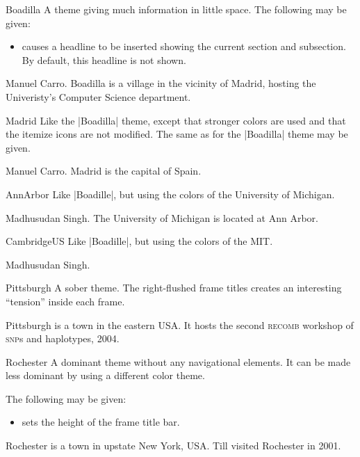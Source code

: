 \begin{themeexample}{Boadilla}
  A theme giving much information in little space. The following  may be given:
  \begin{itemize}
  \item {} causes a headline to be inserted showing the current section and subsection. By default, this headline is not shown.
  \end{itemize}

  \themeauthor Manuel Carro. Boadilla is a village in the vicinity of Madrid, hosting the Univeristy's Computer Science department.
\end{themeexample}

\begin{themeexample}{Madrid}
  Like the |Boadilla| theme, except that stronger colors are used and that the itemize icons are not modified. The same  as for the |Boadilla| theme may be given.

  \themeauthor Manuel Carro. Madrid is the capital of Spain.
\end{themeexample}

\begin{themeexample}{AnnArbor}
  Like |Boadille|, but using the colors of the University of Michigan.

  \themeauthor Madhusudan Singh. The University of Michigan is located at Ann Arbor.
\end{themeexample}

\begin{themeexample}{CambridgeUS}
  Like |Boadille|, but using the colors of the MIT.

  \themeauthor Madhusudan Singh.
\end{themeexample}

\begin{themeexample}{Pittsburgh}
  A sober theme. The right-flushed frame titles creates an interesting ``tension'' inside each frame.

  Pittsburgh is a town in the eastern USA. It hosts the second \textsc{recomb} workshop of \textsc{snp}s and haplotypes, 2004.
\end{themeexample}

\begin{themeexample}{Rochester}
  A dominant theme without any navigational elements. It can be made less dominant by using a different color theme.

  The following  may be given:
  \begin{itemize}
  \item {} sets the height of the frame title bar.
  \end{itemize}

  Rochester is a town in upstate New York, USA. Till visited Rochester in 2001.
\end{themeexample}


